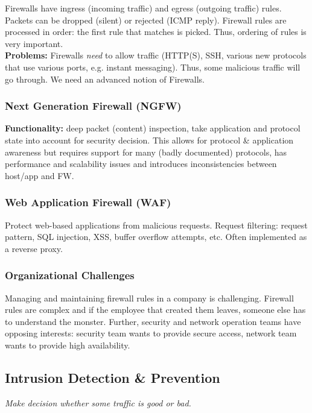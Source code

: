 \documentclass[11pt,oneside,a4paper]{article}
\begin{document}
Firewalls have ingress (incoming traffic) and egress (outgoing traffic) rules. Packets can be dropped (silent) or rejected (ICMP reply). Firewall rules are processed in order: the first rule that matches is picked. Thus, ordering of rules is very important.\\

\textbf{Problems:} Firewalls \textit{need} to allow traffic (HTTP(S), SSH, various new protocols that use various ports, e.g. instant messaging). Thus, some malicious traffic will go through. We need an advanced notion of Firewalls.

\subsubsection{Next Generation Firewall (NGFW)}

\textbf{Functionality:} deep packet (content) inspection, take application and protocol state into
account for security decision. This allows for protocol \& application awareness but requires support for many (badly documented) protocols, has performance and scalability issues and introduces inconsistencies between host/app and FW.

\subsubsection{Web Application Firewall (WAF)}

Protect web-based applications from malicious requests. Request filtering: request pattern, SQL injection, XSS, buffer overflow attempts, etc. Often implemented as a reverse proxy.

\subsubsection{Organizational Challenges}

Managing and maintaining firewall rules in a company is challenging. Firewall rules are complex and if the employee that created them leaves, someone else has to understand the monster. Further, security and network operation teams have opposing interests: security team wants to provide secure access, network team wants to provide high availability.

\subsection{Intrusion Detection \& Prevention}

\textit{Make decision whether some traffic is good or bad.}
\end{document}
